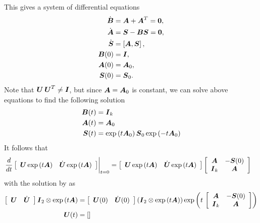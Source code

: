 \documentclass[11pt]{article}
\begin{document}
\begin{enumerate}
 This gives a system of differential equations 
 \begin{align}
 \dot{\boldsymbol{B}} & = \boldsymbol{A} + \boldsymbol{A}^{T} = \boldsymbol{0},\nonumber\\
 \dot{\boldsymbol{A}}&= \boldsymbol{S} - \boldsymbol{B}\boldsymbol{S} = \boldsymbol{0}, \nonumber\\
 \dot{\boldsymbol{S}} & = \left[\boldsymbol{A}, \boldsymbol{S}\right], \nonumber\\
 \boldsymbol{B}(0) &= \boldsymbol{I}, \nonumber\\
 \boldsymbol{A}(0) &= \boldsymbol{A}_{0},\nonumber\\
 \boldsymbol{S}(0) &=  \boldsymbol{S}_{0}.\label{eqn: diff_geodesic_eqn}
 \end{align}
Note that $\boldsymbol{U\,U}^{T}\neq \boldsymbol{I}$, but since $\boldsymbol{A}= \boldsymbol{A}_{0}$ is constant, we can solve above equations to find the following solution \citep{edelman1998geometry}
\begin{align*}
\boldsymbol{B}(t) &= \boldsymbol{I}_{k} \\
\boldsymbol{A}(t) &= \boldsymbol{A}_{0}\\
\boldsymbol{S}(t) &=  \exp\left(t\boldsymbol{A}_{0}\right)\boldsymbol{S}_{0}\exp\left(-t\boldsymbol{A}_{0}\right)
\end{align*}
It follows that 
\begin{align}
\left.{\frac{d}{dt}\left[\begin{array}{cc}
\boldsymbol{U}\exp\left(t\boldsymbol{A}\right) & \dot{\boldsymbol{U}}\exp\left(t\boldsymbol{A}\right)
\end{array} \right]}\right\vert_{t=0}
&= \left[\begin{array}{cc}
\boldsymbol{U}\exp\left(t\boldsymbol{A}\right) & \dot{\boldsymbol{U}}\exp\left(t\boldsymbol{A}\right)
\end{array} \right]
\left[\begin{array}{cc}
\boldsymbol{A} & -\boldsymbol{S}(0) \\ 
\boldsymbol{I}_{k} & \boldsymbol{A}
\end{array} \right] 
\end{align}
with the solution by \citep{edelman1998geometry} as 
\begin{align}
\left[\begin{array}{cc}
\boldsymbol{U}& \dot{\boldsymbol{U}}
\end{array} \right]\boldsymbol{I}_{2}\otimes\exp\left(t\boldsymbol{A}\right)  &=  \left[\begin{array}{cc}
\boldsymbol{U}(0)& \dot{\boldsymbol{U}}(0)
\end{array} \right]\left(\boldsymbol{I}_{2}\otimes\exp\left(t\boldsymbol{A}\right)\right) \exp\left(t\,\left[\begin{array}{cc}
\boldsymbol{A} & -\boldsymbol{S}(0) \\ 
\boldsymbol{I}_{k} & \boldsymbol{A}
\end{array} \right] \right) \nonumber\\
\boldsymbol{U}(t) &=  \left[\begin{array}{cc}

\end{array}\right]
\end{align}
\end{enumerate}
\end{document}
